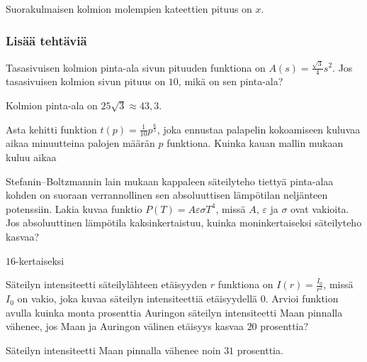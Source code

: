 \begin{tehtavasivu}
\begin{tehtava}
Suorakulmaisen kolmion molempien kateettien pituus on $x$.
	\begin{vastaus}
	\end{vastaus}
\end{tehtava}

\subsubsection*{Lisää tehtäviä}

\begin{tehtava}
Tasasivuisen kolmion pinta-ala sivun pituuden funktiona on $A(s) = \frac{\sqrt{3}}{4}s^{2}$. Jos tasasivuisen kolmion sivun pituus on $10$, mikä on sen pinta-ala?
\begin{vastaus}
Kolmion pinta-ala on $25\sqrt{3}\approx43,3$.
\end{vastaus}
\end{tehtava}

\begin{tehtava}
Asta kehitti funktion $t(p)=\frac{1}{10}p^{\frac{6}{5}}$, joka ennustaa palapelin kokoamiseen kuluvaa aikaa minuutteina palojen määrän $p$ funktiona. Kuinka kauan mallin mukaan kuluu aikaa
\begin{vastaus}
\end{vastaus}
\end{tehtava}

\begin{tehtava}
Stefanin--Boltzmannin lain mukaan kappaleen säteilyteho tiettyä pinta-alaa kohden on suoraan verrannollinen sen absoluuttisen lämpötilan neljänteen potenssiin. Lakia kuvaa funktio $ P(T)=A\varepsilon\sigma T^4 $, missä $A$, $\varepsilon$ ja $\sigma $ ovat vakioita. Jos absoluuttinen lämpötila kaksinkertaistuu, kuinka moninkertaiseksi säteilyteho kasvaa?
\begin{vastaus}
$16$-kertaiseksi
\end{vastaus}
\end{tehtava}

\begin{tehtava}
Säteilyn intensiteetti säteilylähteen etäisyyden $r$ funktiona on $ I(r)=\frac{I_0}{r^{2}}$, missä $I_0$ on vakio, joka kuvaa säteilyn intensiteettiä etäisyydellä $0$. Arvioi funktion avulla kuinka monta prosenttia Auringon säteilyn intensiteetti Maan pinnalla vähenee, jos Maan ja Auringon välinen etäisyys kasvaa $20$ prosenttia?
\begin{vastaus}
Säteilyn intensiteetti Maan pinnalla vähenee noin $31$ prosenttia.
\end{vastaus}
\end{tehtava}

\end{tehtavasivu}